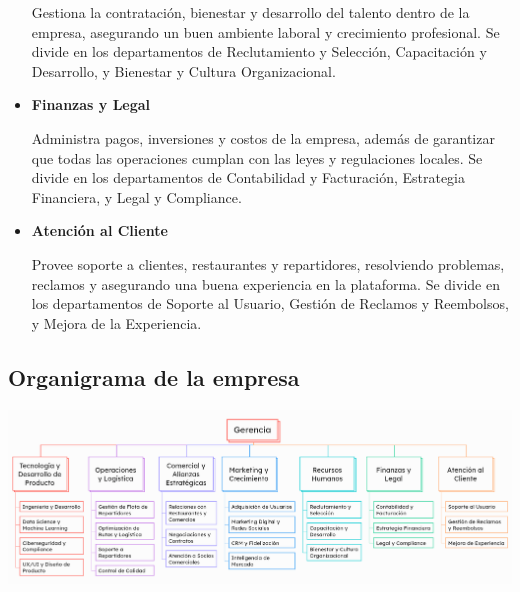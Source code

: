 \begin{itemize}
    Gestiona la contratación, bienestar y desarrollo del talento dentro de la empresa, asegurando un buen ambiente laboral y crecimiento profesional. Se divide en los departamentos de Reclutamiento y Selección, Capacitación y Desarrollo, y Bienestar y Cultura Organizacional.

    \item \textbf{Finanzas y Legal} \nopagebreak
    
    Administra pagos, inversiones y costos de la empresa, además de garantizar que todas las operaciones cumplan con las leyes y regulaciones locales. Se divide en los departamentos de Contabilidad y Facturación, Estrategia Financiera, y Legal y Compliance.

    \item \textbf{Atención al Cliente} \nopagebreak
    
    Provee soporte a clientes, restaurantes y repartidores, resolviendo problemas, reclamos y asegurando una buena experiencia en la plataforma. Se divide en los departamentos de Soporte al Usuario, Gestión de Reclamos y Reembolsos, y Mejora de la Experiencia.
\end{itemize}

\subsection{Organigrama de la empresa}
\includegraphics[width=\textwidth]{./img/organigrama.png}
